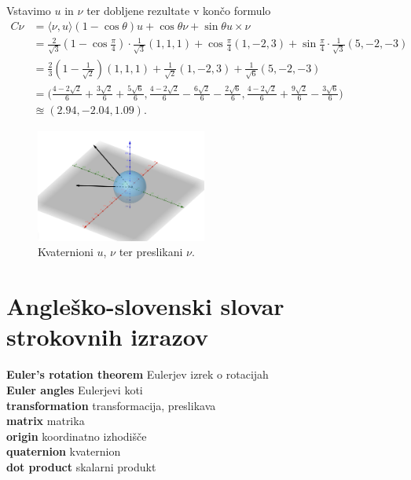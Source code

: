 \documentclass[a4paper,12pt]{article}
\newcommand{\geslo}[2]{\noindent\textbf{#1} \quad \hangindent=1cm #2\\[-1pc]}
\newcommand{\dotpr}[2]{\langle #1, #2 \rangle}
\begin{document}
Vstavimo $u$ in $\nu$ ter dobljene rezultate v končo formulo
\begin{align*}
   C\nu &= \dotpr{\nu}{u}(1 - \cos\theta)u + \cos\theta \nu + \sin\theta u\times\nu\\
        &= \frac{2}{\sqrt{3}}(1 - \cos\frac{\pi}{4}) \cdot \frac{1}{\sqrt{3}}(1,1,1) + \cos\frac{\pi}{4}(1,-2,3) + \sin\frac{\pi}{4} \cdot \frac{1}{\sqrt{3}}(5,-2,-3)\\
        &= \frac{2}{3}(1 - \frac{1}{\sqrt{2}})(1,1,1) + \frac{1}{\sqrt{2}}(1,-2,3) + \frac{1}{\sqrt{6}}(5,-2,-3)\\
        &= \big( \frac{4-2\sqrt{2}}{6} + \frac{3\sqrt{2}}{6} + \frac{5\sqrt{6}}{6},\frac{4-2\sqrt{2}}{6} - \frac{6\sqrt{2}}{6} - \frac{2\sqrt{6}}{6}, \frac{4-2\sqrt{2}}{6} + \frac{9\sqrt{2}}{6} - \frac{3\sqrt{6}}{6}\big)\\
        &\approxeq (2.94, -2.04, 1.09).
\end{align*}

\begin{figure}[ht]
   \centering
   \includegraphics[width = 0.5\textwidth]{vektorji_nu_nu2}
   \caption{Kvaternioni $u$, $\nu$ ter preslikani $\nu$.}
\end{figure}


\newpage


\section*{Angleško-slovenski slovar strokovnih izrazov}

\geslo{Euler's rotation theorem}{Eulerjev izrek o rotacijah}

\geslo{Euler angles}{Eulerjevi koti}

\geslo{transformation}{transformacija, preslikava}

\geslo{matrix}{matrika}

\geslo{origin}{koordinatno izhodišče}

\geslo{quaternion}{kvaternion}

\geslo{dot product}{skalarni produkt}
\end{document}
